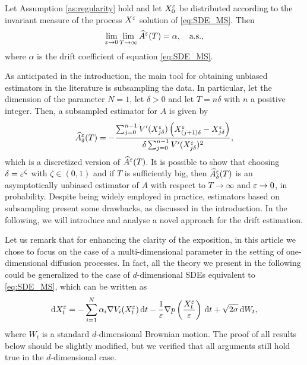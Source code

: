 \documentclass[10pt]{article}
\begin{document}
\begin{theorem}\label{thm:Bias} Let Assumption \ref{as:regularity} hold and let $X^\varepsilon_0$ be distributed according to the invariant measure of the process $X^\varepsilon$ solution of \eqref{eq:SDE_MS}. Then
	\begin{equation}
		\lim_{\varepsilon \to 0}\lim_{T \to \infty} \widehat A^\varepsilon(T) = \alpha, \quad \text{a.s.},
	\end{equation}
	where $\alpha$ is the drift coefficient of equation \eqref{eq:SDE_MS}.
\end{theorem}

As anticipated in the introduction, the main tool for obtaining unbiased estimators in the literature is subsampling the data. In particular, let the dimension of the parameter $N = 1$, let $\delta > 0$ and let $T = n\delta$ with $n$ a positive integer. Then, a subsampled estimator for $A$ is given by
\begin{equation}
	\widehat A^\varepsilon_\delta(T) = - \frac{\sum_{j=0}^{n-1} V'(X^\varepsilon_{j\delta})\left(X^\varepsilon_{(j+1)\delta} - X^\varepsilon_{j\delta}\right)}{\delta \sum_{j=0}^{n-1} V'(X^\varepsilon_{j\delta})^2},
\end{equation}
which is a discretized version of $\widehat A^\varepsilon(T)$. It is possible to show \cite[Theorem 3.5]{PaS07} that choosing $\delta = \varepsilon^\zeta$ with $\zeta \in (0, 1)$ and if $T$ is sufficiently big, then $\widehat A^\varepsilon_\delta(T)$ is an asymptotically unbiased estimator of $A$ with respect to $T \to \infty$ and $\varepsilon \to 0$, in probability. Despite being widely employed in practice, estimators based on subsampling present some drawbacks, as discussed in the introduction. In the following, we will introduce and analyse a novel approach for the drift estimation.

\begin{remark} Let us remark that for enhancing the clarity of the exposition, in this article we chose to focus on the case of a multi-dimensional parameter in the setting of one-dimensional diffusion processes. In fact, all the theory we present in the following could be generalized to the case of $d$-dimensional SDEs equivalent to \eqref{eq:SDE_MS}, which can be written as
	\begin{equation}
		\mathrm{d} X_t^\varepsilon = - \sum_{i=1}^N \alpha_i \nabla V_i(X_t^\varepsilon) \,\mathrm{d} t - \frac1{\varepsilon} \nabla p\left(\frac{X_t^\varepsilon}{\varepsilon}\right) \,\mathrm{d} t + \sqrt{2\sigma} \,\mathrm{d} W_t,
	\end{equation}
	where $W_t$ is a standard $d$-dimensional Brownian motion. The proof of all results below should be slightly modified, but we verified that all arguments still hold true in the $d$-dimensional case. 
\end{remark}
\end{document}
